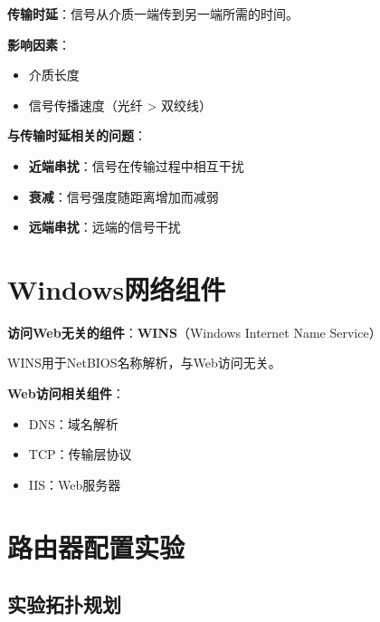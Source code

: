 \documentclass[12pt,a4paper]{ctexart}
\begin{document}
\begin{keybox}
\textbf{传输时延}：信号从介质一端传到另一端所需的时间。

\textbf{影响因素}：
\begin{itemize}[itemsep=0pt]
    \item 介质长度
    \item 信号传播速度（光纤 > 双绞线）
\end{itemize}

\textbf{与传输时延相关的问题}：
\begin{itemize}[itemsep=0pt]
    \item \textbf{近端串扰}：信号在传输过程中相互干扰
    \item \textbf{衰减}：信号强度随距离增加而减弱
    \item \textbf{远端串扰}：远端的信号干扰
\end{itemize}
\end{keybox}

\section{Windows网络组件}

\begin{keybox}
\textbf{访问Web无关的组件}：\textbf{WINS}（Windows Internet Name Service）

WINS用于NetBIOS名称解析，与Web访问无关。

\textbf{Web访问相关组件}：
\begin{itemize}[itemsep=0pt]
    \item DNS：域名解析
    \item TCP：传输层协议
    \item IIS：Web服务器
\end{itemize}
\end{keybox}

\section{路由器配置实验}

\subsection{实验拓扑规划}
\end{document}
